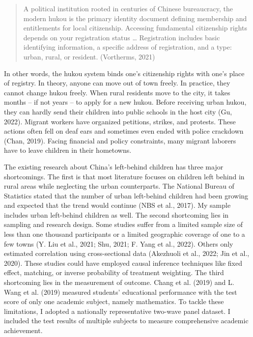 \documentclass[
  man,floatsintext]{apa7}
\begin{document}
\begin{quote}
A political institution rooted in centuries of Chinese bureaucracy, the modern hukou is the primary identity document defining membership and entitlements for local citizenship. Accessing fundamental citizenship rights depends on your registration status \ldots{} Registration includes basic identifying information, a specific address of registration, and a type: urban, rural, or resident. (Vortherms, 2021)
\end{quote}

In other words, the hukou system binds one's citizenship rights with one's place of registry. In theory, anyone can move out of town freely. In practice, they cannot change hukou freely. When rural residents move to the city, it takes months -- if not years -- to apply for a new hukou. Before receiving urban hukou, they can hardly send their children into public schools in the host city (Gu, 2022). Migrant workers have organized petitions, strikes, and protests. These actions often fell on deaf ears and sometimes even ended with police crackdown (Chan, 2019). Facing financial and policy constraints, many migrant laborers have to leave children in their hometowns.

The existing research about China's left-behind children has three major shortcomings. The first is that most literature focuses on children left behind in rural areas while neglecting the urban counterparts. The National Bureau of Statistics stated that the number of urban left-behind children had been growing and expected that the trend would continue (NBS et al., 2017). My sample includes urban left-behind children as well. The second shortcoming lies in sampling and research design. Some studies suffer from a limited sample size of less than one thousand participants or a limited geographic coverage of one to a few towns (Y. Liu et al., 2021; Shu, 2021; F. Yang et al., 2022). Others only estimated correlation using cross-sectional data (Akezhuoli et al., 2022; Jin et al., 2020). These studies could have employed causal inference techniques like fixed effect, matching, or inverse probability of treatment weighting. The third shortcoming lies in the measurement of outcome. Chang et al. (2019) and L. Wang et al. (2019) measured students' educational performance with the test score of only one academic subject, namely mathematics. To tackle these limitations, I adopted a nationally representative two-wave panel dataset. I included the test results of multiple subjects to measure comprehensive academic achievement.
\end{document}
